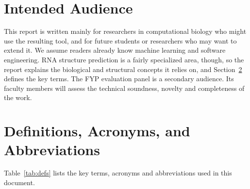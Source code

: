 \documentclass{FastFyp}
\begin{document}
\section{Intended Audience}
This report is written mainly for researchers in computational biology who might use the resulting tool, and for future students or researchers who may want to extend it. We assume readers already know machine learning and software engineering. RNA structure prediction is a fairly specialized area, though, so the report explains the biological and structural concepts it relies on, and Section~\ref{sec:definitions} defines the key terms. The FYP evaluation panel is a secondary audience. Its faculty members will assess the technical soundness, novelty and completeness of the work.

\section{Definitions, Acronyms, and Abbreviations}
\label{sec:definitions}
Table~\ref{tab:defs} lists the key terms, acronyms and abbreviations used in this document.
\end{document}
